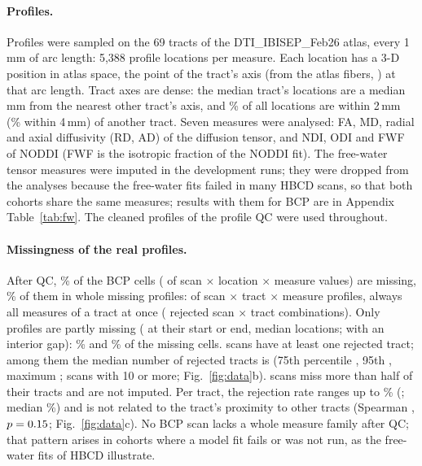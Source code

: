 \documentclass[11pt]{article}
\begin{document}
\paragraph{Profiles.} Profiles were sampled on the 69 tracts of the DTI\_IBISEP\_Feb26 atlas, every 1\,mm
of arc length: 5,388 profile locations per measure. Each location has a 3-D position in atlas space, the point of the
tract's axis (from the atlas fibers, ) at that arc length. Tract axes are dense:
the median tract's locations are a median \axisTractMedian{}\,mm from the nearest other tract's axis, and
\axisWithinTwo\% of all locations are within 2\,mm (\axisWithinFour\% within 4\,mm) of another tract. Seven measures
were analysed: FA, MD, radial and axial diffusivity (RD, AD) of the diffusion tensor, and NDI, ODI and FWF of NODDI
\citep{zhang2012noddi} (FWF is the isotropic fraction of the NODDI fit). The free-water tensor measures
\citep{pasternak2009freewater} were imputed in the development runs; they were dropped from the analyses because the
free-water fits failed in many HBCD scans, so that both cohorts share the same measures; results with them for BCP are
in Appendix Table~\ref{tab:fw}. The cleaned profiles of the profile QC were used throughout.

\paragraph{Missingness of the real profiles.} After QC, \missCellShare\% of the BCP cells (\missCells{} of \allCells{}
scan $\times$ location $\times$ measure values) are missing, \realShareWhole\% of them in whole missing profiles:
\missWholeN{} of \missProfilesN{} scan $\times$ tract $\times$ measure profiles, always all measures of a tract at once
(\missRejectedTracts{} rejected scan $\times$ tract combinations). Only \missPartialN{} profiles are partly missing
(\missPartialEnds{} at their start or end, median \missEndLenMedian{} locations; \missPartialInner{} with an interior
gap): \realShareEnd\% and \realShareGap\% of the missing cells. \rejScans{} scans have at least one rejected tract;
among them the median number of rejected tracts is \rejMedian{} (75th percentile \rejQThree{}, 95th \rejPNinetyFive{},
maximum \rejMax{}; \rejTenPlus{} scans with 10 or more; Fig.~\ref{fig:data}b). \missScansHalf{} scans miss more than half
of their tracts and are not imputed. Per tract, the rejection rate ranges up to \missTractMax\% (\missTractMaxName;
median \missTractMedian\%) and is not related to the tract's proximity to other tracts (Spearman \rejProxRho, $p =
0.15$; Fig.~\ref{fig:data}c). No BCP scan lacks a whole measure family after QC; that pattern arises in cohorts
where a model fit fails or was not run, as the free-water fits of HBCD illustrate.
\end{document}
